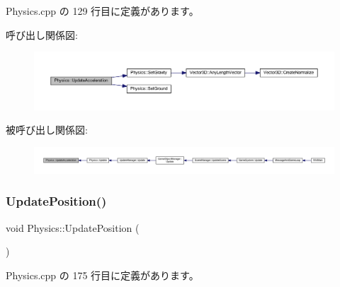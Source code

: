  Physics.\+cpp の 129 行目に定義があります。

呼び出し関係図\+:\nopagebreak
\begin{figure}[H]
\begin{center}
\leavevmode
\includegraphics[width=350pt]{class_physics_a122041053c2c4e69cdf6dc92076e1d79_cgraph}
\end{center}
\end{figure}
被呼び出し関係図\+:
\nopagebreak
\begin{figure}[H]
\begin{center}
\leavevmode
\includegraphics[width=350pt]{class_physics_a122041053c2c4e69cdf6dc92076e1d79_icgraph}
\end{center}
\end{figure}
\mbox{\label{class_physics_a481f06d777c1b1f52dc2c06c71e93932}} 
\subsubsection{\texorpdfstring{Update\+Position()}{UpdatePosition()}}
{\footnotesize\ttfamily void Physics\+::\+Update\+Position (\begin{DoxyParamCaption}{ }\end{DoxyParamCaption})\hspace{0.3cm}{\ttfamily [private]}}



 Physics.\+cpp の 175 行目に定義があります。

